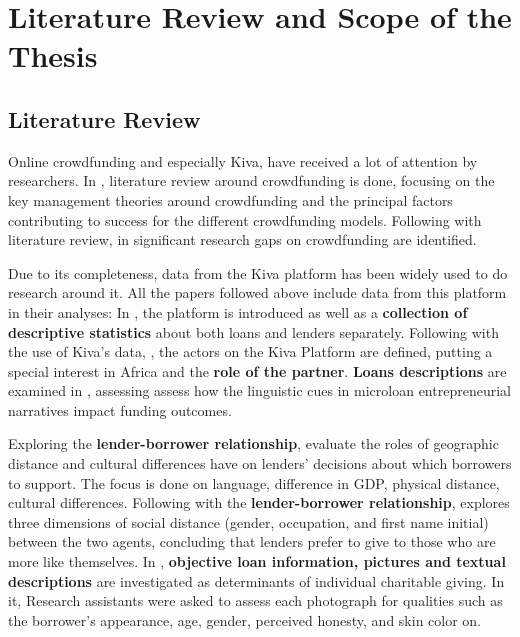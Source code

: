 
\chapter{Literature Review and Scope of the Thesis} %

\label{Chapter2} %


\section{Literature Review}

Online crowdfunding and especially Kiva, have received a lot of attention by researchers. In \textcite{Alegre2017}, literature review around crowdfunding is done, focusing on the key management theories around crowdfunding and the principal factors contributing to success for the different crowdfunding models. Following with literature review, in \textcite{Moleskis2018} significant research gaps on crowdfunding are identified. \par
Due to its completeness, data from the Kiva platform has been widely used to do research around it. All the papers followed above include data from this platform in their analyses: In \textcite{Moleskis2016}, the platform is introduced as well as a \textbf{collection of descriptive statistics} about both loans and lenders separately. Following with the use of Kiva's data, \textcite{Canela2017}, the actors on the Kiva Platform are defined, putting a special interest in Africa and the \textbf{role of the partner}. 
\textbf{Loans descriptions} are examined in \textcite{Allison2015}, assessing assess how the linguistic cues in microloan entrepreneurial narratives impact funding outcomes. \par
Exploring the \textbf{lender-borrower relationship}, \textcite{Burtch2013} evaluate the roles of geographic distance and cultural differences have on lenders’ decisions about which borrowers to support. The focus is done on language, difference in GDP, physical distance, cultural differences.
Following with the \textbf{lender-borrower relationship}, \textcite{Galak2010} explores three dimensions of social distance (gender, occupation, and first name initial) between the two agents, concluding that lenders prefer to give to those who are more like themselves. 
In \textcite{Jenq2011}, \textbf{objective loan information, pictures and textual descriptions} are investigated as determinants of individual charitable giving. In it, Research assistants were asked to assess each photograph for qualities such as the borrower’s appearance, age, gender, perceived honesty, and skin color on. \par

